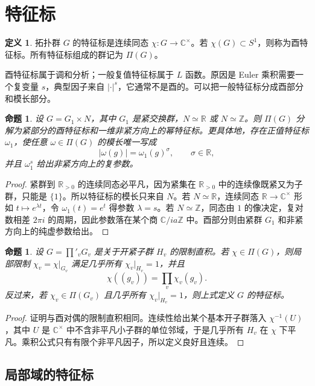 \documentclass[11pt,a4paper,openany]{ctexbook}
\numberwithin{equation}{chapter}
\newcommand{\R}{\mathbb{R}}
\newcommand{\C}{\mathbb{C}}
\newcommand{\Z}{\mathbb{Z}}
\theoremstyle{plain}
\newtheorem{proposition}[theorem]{命题}
\theoremstyle{definition}
\newtheorem{definition}[theorem]{定义}
\theoremstyle{remark}
\begin{document}
\section{特征标}

\begin{definition}
拓扑群 $G$ 的特征标是连续同态 $\chi:G\to\C^\times$。若 $\chi(G)\subset S^1$，则称为酉特征标。所有特征标组成的群记为 $\Pi(G)$。
\end{definition}

酉特征标属于调和分析；一般复值特征标属于 $L$ 函数。原因是 Euler 乘积需要一个复变量 $s$，典型因子来自 $|\cdot|^s$，它通常不是酉的。可以把一般特征标分成酉部分和模长部分。

\begin{proposition}
设 $G=G_1\times N$，其中 $G_1$ 是紧交换群，$N\simeq\R$ 或 $N\simeq\Z$。则 $\Pi(G)$ 分解为紧部分的酉特征标和一维非紧方向上的幂特征标。更具体地，存在正值特征标 $\omega_1$，使任意 $\omega\in\Pi(G)$ 的模长唯一写成
\[
  |\omega(g)|=\omega_1(g)^\sigma,\qquad \sigma\in\R,
\]
并且 $\omega_1^s$ 给出非紧方向上的复参数。
\end{proposition}

\begin{proof}
紧群到 $\R_{>0}$ 的连续同态必平凡，因为紧集在 $\R_{>0}$ 中的连续像既紧又为子群，只能是 $\{1\}$。所以特征标的模长只来自 $N$。若 $N\simeq\R$，连续同态 $\R\to\C^\times$ 形如 $t\mapsto e^{\lambda t}$，令 $\omega_1(t)=e^t$ 得参数 $\lambda=s$。若 $N\simeq\Z$，同态由 $1$ 的像决定，复对数相差 $2\pi i$ 的周期，因此参数落在某个商 $\C/ia\Z$ 中。酉部分则由紧群 $G_1$ 和非紧方向上的纯虚参数给出。
\end{proof}

\begin{proposition}
设 $G=\prod'_vG_v$ 是关于开紧子群 $H_v$ 的限制直积。若 $\chi\in\Pi(G)$，则局部限制 $\chi_v=\chi|_{G_v}$ 满足几乎所有 $\chi_v|_{H_v}=1$，并且
\[
  \chi((g_v))=\prod_v\chi_v(g_v).
\]
反过来，若 $\chi_v\in\Pi(G_v)$ 且几乎所有 $\chi_v|_{H_v}=1$，则上式定义 $G$ 的特征标。
\end{proposition}

\begin{proof}
证明与酉对偶的限制直积相同。连续性给出某个基本开子群落入 $\chi^{-1}(U)$，其中 $U$ 是 $\C^\times$ 中不含非平凡小子群的单位邻域，于是几乎所有 $H_v$ 在 $\chi$ 下平凡。乘积公式只有有限个非平凡因子，所以定义良好且连续。
\end{proof}

\subsection{局部域的特征标}
\end{document}
